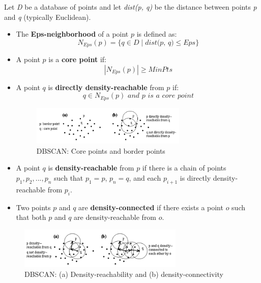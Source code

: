 \documentclass[a4paper,12pt,twoside]{scrreprt}
\begin{document}
Let \textit{D} be a database of points and let \textit{dist(p, q)} be the
distance between points \textit{p} and \textit{q} (typically Euclidean).

\begin{itemize}
  \item The \textbf{Eps-neighborhood} of a point $p$ is defined as:
        \[
          N_{\textit{Eps}}(p) = \{q \in D \mid \textit{dist(p, q)} \leq
          \textit{Eps} \}
        \]

  \item A point $p$ is a \textbf{core point} if:
        \[
          |N_{\textit{Eps}}(p)| \geq \textit{MinPts}
        \]

  \item A point $q$ is \textbf{directly density-reachable} from $p$ if:
        \[
          q \in N_{\textit{Eps}}(p) \textit{ and } p \textit{ is a core point}
        \]

        \begin{figure}[htbp]
          \centering

          \includegraphics[width=0.7\textwidth]{Figures/background/dbscan_core_points_and_border_points.png}
          \caption{DBSCAN: Core points and border points
            \cite{ester_density-based_nodate}}
          \label{fig:dbscan-reachability-and-connectivity}
        \end{figure}

  \item A point $q$ is \textbf{density-reachable} from $p$ if there is a chain
        of points
        $p_1, p_2, ..., p_n$ such that $p_1 = p$, $p_n = q$, and each $p_{i+1}$
        is
        directly
        density-reachable from $p_i$.

  \item Two points $p$ and $q$ are \textbf{density-connected} if there exists a
        point
        $o$ such that both $p$ and $q$ are density-reachable from $o$.
\end{itemize}

\begin{figure}[htbp]
  \centering

  \includegraphics[width=0.7\textwidth]{Figures/background/dbscan_density_reachability_connectivity.png}
  \caption{DBSCAN: (a) Density-reachability and (b) density-connectivity
    \cite{ester_density-based_nodate}}
  \label{fig:dbscan-reachability-and-connectivity}
\end{figure}
\FloatBarrier
\end{document}
